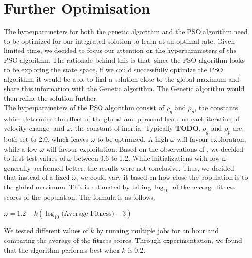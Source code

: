 \documentclass[12pt]{article}
\begin{document}
	\section{Further Optimisation}
	The hyperparameters for both the genetic algorithm and the PSO algorithm need
	to be optimized for our integrated solution to learn at an optimal rate.
	Given limited time, we decided to focus our attention on the hyperparameters
	of the PSO algorithm. The rationale behind this is that, since the PSO
	algorithm looks to be exploring the state space, if we could successfully optimize
	the PSO algorithm, it would be able to find a solution close to the global
	maximum and share this information with the Genetic algorithm.
	The Genetic algorithm would then refine the solution further.\\

	The hyperparameters of the PSO algorithm consist of $\rho_g$ and $\rho_p$, the constants
	which determine the effect of the global and personal bests on each iteration
	of velocity change; and $\omega$, the constant of inertia. Typically \textbf{TODO}, $\rho_g$ and $\rho_p$ are both
	set to 2.0, which leaves $\omega$ to be optimized. A high $\omega$ will favour exploration,
	while a low $\omega$ will favour exploitation. Based on the observations of
	\cite{shi1998parameter}, we decided to first test values of $\omega$ between 0.6 to 1.2.
	While initializations with low $\omega$ generally performed better, the results were
	not conclusive. Thus, we decided that instead of a fixed $\omega$, we could vary it
	based on how close the population is to the global maximum. This is estimated
	by taking $\log_{10}$ of the average fitness scores of the population. The formula is as follows:

	\begin{center}
		$\omega = 1.2 - k(\log_{10}\text{(Average Fitness)} - 3)$
	\end{center}

	We tested different values of $k$ by running multiple jobs for an hour and comparing
 	the average of the fitness scores. Through experimentation, we found that the
	algorithm performs best when $k$ is 0.2.\\


\end{document}
